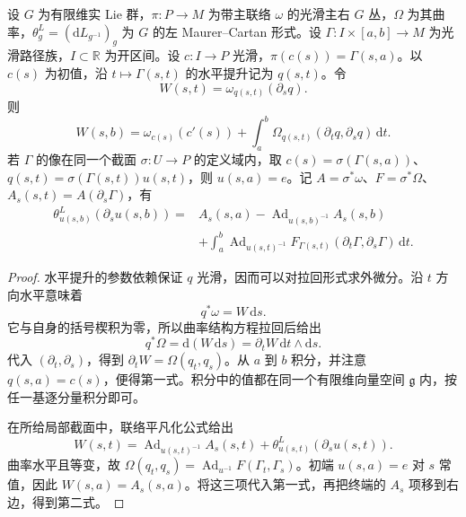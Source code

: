 \begin{theorem}\label{g1:thm:principal-transport-variation}
	设 \(G\) 为有限维实 Lie 群，\(\pi:P\to M\) 为带主联络 \(\omega\) 的光滑主右 \(G\) 丛，\(\Omega\) 为其曲率，\(\theta^L_g=(\mathrm{d}L_{g^{-1}})_g\) 为 \(G\) 的左 Maurer--Cartan 形式。设 \(\Gamma:I\times[a,b]\to M\) 为光滑路径族，\(I\subset\mathbb R\) 为开区间。设 \(c:I\to P\) 光滑，\(\pi(c(s))=\Gamma(s,a)\)。以 \(c(s)\) 为初值，沿 \(t\mapsto\Gamma(s,t)\) 的水平提升记为 \(q(s,t)\)。令
	\[
		W(s,t)=\omega_{q(s,t)}(\partial_s q).
	\]
	则
	\begin{equation}\label{g1:eq:principal-variation-intrinsic}
		W(s,b)=\omega_{c(s)}(c'(s))+\int_a^b\Omega_{q(s,t)}(\partial_tq,\partial_sq)\,\mathrm{d}t.
	\end{equation}
	若 \(\Gamma\) 的像在同一个截面 \(\sigma:U\to P\) 的定义域内，取 \(c(s)=\sigma(\Gamma(s,a))\)、\(q(s,t)=\sigma(\Gamma(s,t))u(s,t)\)，则 \(u(s,a)=e\)。记 \(A=\sigma^*\omega\)、\(F=\sigma^*\Omega\)、\(A_s(s,t)=A(\partial_s\Gamma)\)，有
	\begin{equation}\label{g1:eq:principal-variation-endpoints}
		\begin{split}
			\theta^L_{u(s,b)}(\partial_su(s,b))
			={}&A_s(s,a)-\operatorname{Ad}_{u(s,b)^{-1}}A_s(s,b)\\
			&+\int_a^b\operatorname{Ad}_{u(s,t)^{-1}}F_{\Gamma(s,t)}(\partial_t\Gamma,\partial_s\Gamma)\,\mathrm{d}t.
		\end{split}
	\end{equation}
\end{theorem}
\begin{proof}
	水平提升的参数依赖保证 \(q\) 光滑，因而可以对拉回形式求外微分。沿 \(t\) 方向水平意味着
	\[
		q^*\omega=W\,\mathrm{d}s.
	\]
	它与自身的括号楔积为零，所以曲率结构方程拉回后给出
	\[
		q^*\Omega=\mathrm{d}(W\,\mathrm{d}s)=\partial_tW\,\mathrm{d}t\wedge\mathrm{d}s.
	\]
	代入 \((\partial_t,\partial_s)\)，得到 \(\partial_tW=\Omega(q_t,q_s)\)。从 \(a\) 到 \(b\) 积分，并注意 \(q(s,a)=c(s)\)，便得第一式。积分中的值都在同一个有限维向量空间 \(\mathfrak g\) 内，按任一基逐分量积分即可。

	在所给局部截面中，联络平凡化公式给出
	\[
		W(s,t)=\operatorname{Ad}_{u(s,t)^{-1}}A_s(s,t)+\theta^L_{u(s,t)}(\partial_su(s,t)).
	\]
	曲率水平且等变，故 \(\Omega(q_t,q_s)=\operatorname{Ad}_{u^{-1}}F(\Gamma_t,\Gamma_s)\)。初端 \(u(s,a)=e\) 对 \(s\) 常值，因此 \(W(s,a)=A_s(s,a)\)。将这三项代入第一式，再把终端的 \(A_s\) 项移到右边，得到第二式。
\end{proof}

